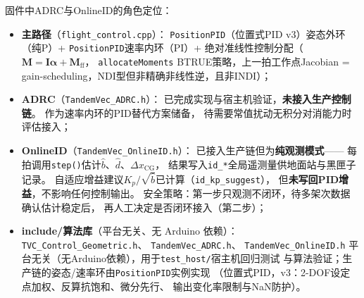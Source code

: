 固件中ADRC与OnlineID的角色定位：
\begin{itemize}
    \item \textbf{主路径}（\texttt{flight\_control.cpp}）：
          \texttt{PositionPID}（位置式PID v3）姿态外环（纯P）+
          \texttt{PositionPID}速率内环（PI）+
          绝对准线性控制分配（$\mathbf{M}=\mathbf{I}\boldsymbol{\alpha}+\mathbf M_{\mathrm{ff}}$，
          \texttt{allocateMoments} BTRUE策略，上一拍工作点Jacobian
          = gain-scheduling，NDI型但非精确非线性逆，且非INDI）；
    \item \textbf{ADRC}（\texttt{TandemVec\_ADRC.h}）：
          已完成实现与宿主机验证，\textbf{未接入生产控制链}。
          作为速率内环的PID替代方案储备，
          待需要常值扰动无积分对消能力时评估接入；
    \item \textbf{OnlineID}（\texttt{TandemVec\_OnlineID.h}）：
          已接入生产链但为\textbf{纯观测模式}——
          每拍调用\texttt{step()}估计$\hat{b}$、$\hat{d}$、$\Delta x_{\mathrm{CG}}$，
          结果写入\texttt{id\_*}全局遥测量供地面站与黑匣子记录。
          自适应增益建议$K_p/\sqrt{\hat{b}}$已计算（\texttt{id\_kp\_suggest}），
          但\textbf{未写回PID增益}，不影响任何控制输出。
          安全策略：第一步只观测不闭环，待多架次数据确认估计稳定后，
          再人工决定是否闭环接入（第二步）；
    \item \textbf{include/算法库}（平台无关、无 Arduino 依赖）：\\[2pt]
          \texttt{TVC\_Control\_Geometric.h}、\allowbreak
          \texttt{TandemVec\_ADRC.h}、\allowbreak
          \texttt{TandemVec\_OnlineID.h}
          平台无关（无Arduino依赖），用于\texttt{test\_host/}宿主机回归测试
          与算法验证；生产链的姿态/速率环由\texttt{PositionPID}实例实现
          （位置式PID，v3：2-DOF设定点加权、反算抗饱和、微分先行、
          输出变化率限制与NaN防护）。
\end{itemize}
